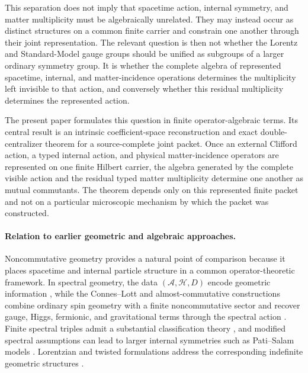 \documentclass[11pt]{article}
\numberwithin{equation}{section}
\theoremstyle{definition}
\theoremstyle{remark}
\newcommand{\A}{\mathcal A}
\newcommand{\Hh}{\mathcal H}
\begin{document}
This separation does not imply that spacetime action, internal symmetry, and
matter multiplicity must be algebraically unrelated.  They may instead occur
as distinct structures on a common finite carrier and constrain one another
through their joint representation.  The relevant question is then not
whether the Lorentz and Standard-Model gauge groups should be unified as
subgroups of a larger ordinary symmetry group.  It is whether the complete
algebra of represented spacetime, internal, and matter-incidence operations
determines the multiplicity left invisible to that action, and conversely
whether this residual multiplicity determines the represented action.

The present paper formulates this question in finite operator-algebraic terms.
Its central result is an intrinsic coefficient-space reconstruction and
exact double-centralizer theorem for a source-complete joint packet.  Once an external Clifford action, a typed
internal action, and physical matter-incidence operators are represented on
one finite Hilbert carrier, the algebra generated by the complete visible
action and the residual typed matter multiplicity determine one another as
mutual commutants.  The theorem depends only on this represented finite
packet and not on a particular microscopic mechanism by which the packet was
constructed.


\paragraph{Relation to earlier geometric and algebraic approaches.}

Noncommutative geometry provides a natural point of comparison because it
places spacetime and internal particle structure in a common
operator-theoretic framework.  In spectral geometry, the data
$(\A,\Hh,D)$ encode geometric information
\cite{Connes1994,ConnesReality1995}, while the Connes--Lott and
almost-commutative constructions combine ordinary spin geometry with a
finite noncommutative sector and recover gauge, Higgs, fermionic, and
gravitational terms through the spectral action
\cite{ConnesLott1991,ConnesGravityMatter1996,ChamseddineConnes1997,
ChamseddineConnesMarcolli2007,ChamseddineConnes2008,
vanSuijlekom2025}.  Finite spectral triples admit a substantial
classification theory \cite{Krajewski1998,IochumSchuckerStephan2004,
vanDenDungenVanSuijlekom2012}, and modified spectral assumptions can lead to
larger internal symmetries such as Pati--Salam models
\cite{ChamseddineConnesVanSuijlekom2013}.  Lorentzian and twisted
formulations address the corresponding indefinite geometric structures
\cite{Barrett2007,DevastatoEtAl2018}.
\end{document}
